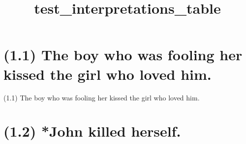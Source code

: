 \documentclass{article}
\begin{document}
%
%

\title{\textbf{test\_interpretations\_table}}
\maketitle

\clearpage

%
%

\section*{(1.1) The boy who was fooling her kissed the girl who loved him.}

\bigbreak
\begin{enumerate*}
\item[(1.1)] The boy who was fooling her kissed the girl who loved him.
\end{enumerate*}
\bigbreak

\bigbreak
\begin{minipage}{\textwidth}
\end{minipage}
\bigbreak

\clearpage

%
%

\section*{(1.2) *John killed herself.}
\end{document}
